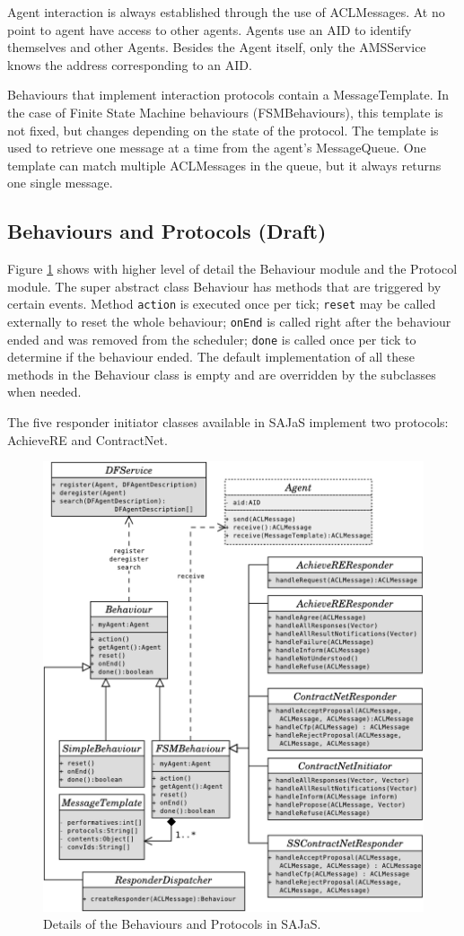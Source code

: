 Agent interaction is always established through the use of ACLMessages. At no point to agent have access to other agents. Agents use an AID to identify themselves and other Agents. Besides the Agent itself, only the AMSService knows the address corresponding to an AID.

Behaviours that implement interaction protocols contain a MessageTemplate. In the case of Finite State Machine behaviours (FSMBehaviours), this template is not fixed, but changes depending on the state of the protocol. The template is used to retrieve one message at a time from the agent's MessageQueue. One template can match multiple ACLMessages in the queue, but it always returns one single message.

\subsection{Behaviours and Protocols (Draft)}
\label{sec:arch_behaviours}
Figure \ref{fig:arch_proto} shows with higher level of detail the Behaviour module and the Protocol module. The super abstract class Behaviour has methods that are triggered by certain events. Method \texttt{action} is executed once per tick; \texttt{reset} may be called externally to reset the whole behaviour; \texttt{onEnd} is called right after the behaviour ended and was removed from the scheduler; \texttt{done} is called once per tick to determine if the behaviour ended. The default implementation of all these methods in the Behaviour class is empty and are overridden by the subclasses when needed.

The five responder initiator classes available in SAJaS implement two protocols: AchieveRE and ContractNet.

\begin{figure}
	\centering
	\includegraphics[width=0.7\linewidth]{figures/sajas_arch_proto.pdf}
	\caption{Details of the Behaviours and Protocols in SAJaS.}
	\label{fig:arch_proto}
\end{figure}

